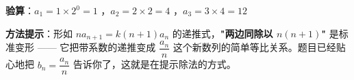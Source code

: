 \begin{answer}
\textbf{验算}：$a_1=1\times2^{0}=1$ ，$a_2=2\times2=4$ ，$a_3=3\times4=12$ 

\begin{gktip}
\textbf{方法提示}：形如 $na_{n+1}=k(n+1)a_n$ 的递推式，\textbf{"两边同除以 $n(n+1)$"} 是标准变形 —— 它把带系数的递推变成 $\dfrac{a_n}n$ 这个新数列的简单等比关系。题目已经贴心地把 $b_n=\dfrac{a_n}n$ 告诉你了，这就是在提示除法的方式。
\end{gktip}




\par\medskip

\end{answer}
